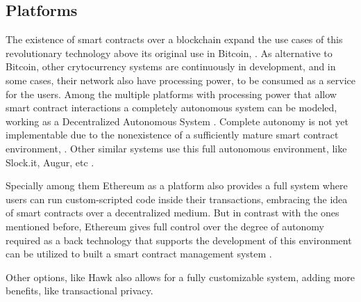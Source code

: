 \subsection{Platforms}
The existence of smart contracts over a blockchain expand the use cases of this revolutionary technology above its original use in Bitcoin, \cite{nakamoto}. As alternative to Bitcoin, other crytocurrency systems are continuously in development, and in some cases, their network also have processing power, to be consumed as a service for the users\cite{uses}. Among the multiple platforms with processing power that allow smart contract interactions a completely autonomous system can be modeled, working as a Decentralized Autonomous System \cite{dao}.
Complete autonomy is not yet implementable 
due to the nonexistence of a sufficiently mature smart contract environment, \cite{daofail}. Other similar systems use this full autonomous environment, like Slock.it, Augur, etc \cite{sense}. 

Specially among them Ethereum \cite{ethereum} as a platform also provides a full system where users can run custom-scripted code inside their transactions, embracing the idea of smart contracts over a decentralized medium. But in contrast with the ones mentioned before, Ethereum gives full control over the degree of autonomy required as a back technology that supports the development of this environment can be utilized to built a smart contract management system \cite{lazy}. 

Other options, like Hawk \cite{hawk} also allows for a fully customizable system, adding more benefits, like transactional privacy.


